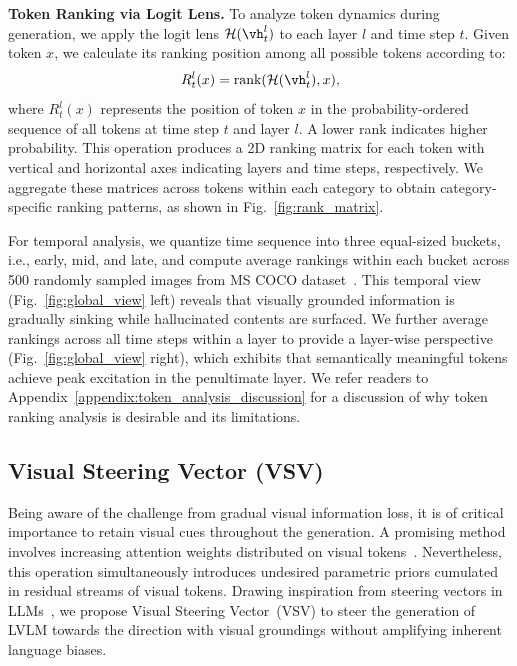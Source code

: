 \documentclass{article}
\theoremstyle{plain}
\theoremstyle{definition}
\theoremstyle{remark}
\begin{document}
\textbf{Token Ranking via Logit Lens.} 
To analyze token dynamics during generation, we apply the logit lens $\mathcal{H}(\vh^l_t)$ to each layer $l$ and time step $t$. Given token $x$, we calculate its ranking position among all possible tokens according to:
\begin{equation}
    R_{t}^l(x) = \text{rank}(\mathcal{H}(\vh^l_t), x),
\end{equation}
where $R_{t}^l(x)$ represents the position of token $x$ in the probability-ordered sequence of all tokens at time step $t$ and layer $l$. A lower rank indicates higher probability.
This operation produces a 2D ranking matrix for each token with vertical and horizontal axes indicating layers and time steps, respectively. We aggregate these matrices across tokens within each category to obtain category-specific ranking patterns, as shown in Fig.~\ref{fig:rank_matrix}.

For temporal analysis, we quantize time sequence into three equal-sized buckets, i.e., early, mid, and late, and compute average rankings within each bucket across 500 randomly sampled images from MS COCO dataset~\cite{lin2014microsoft}. This temporal view (Fig.~\ref{fig:global_view} left) reveals that visually grounded information is gradually sinking while hallucinated contents are surfaced. We further average rankings across all time steps within a layer to provide a layer-wise perspective (Fig.~\ref{fig:global_view} right), which exhibits that semantically meaningful tokens achieve peak excitation in the penultimate layer. We refer readers to Appendix~\ref{appendix:token_analysis_discussion} for a discussion of why token ranking analysis is desirable and its limitations.

\subsection{Visual Steering Vector (VSV)}
\label{sec:method-vsv}
Being aware of the challenge from gradual visual information loss, it is of critical importance to retain visual cues throughout the generation. 
A promising method involves increasing attention weights distributed on visual tokens~\cite{pai}. Nevertheless, this operation simultaneously introduces undesired parametric priors cumulated in residual streams of visual tokens.
Drawing inspiration from steering vectors in LLMs~\cite{turner2023activation, zou2023representation, liu2024incontext, li2024implicit}, we propose Visual Steering Vector~(VSV) to steer the generation of LVLM towards the direction with visual groundings without amplifying inherent language biases.
\end{document}
